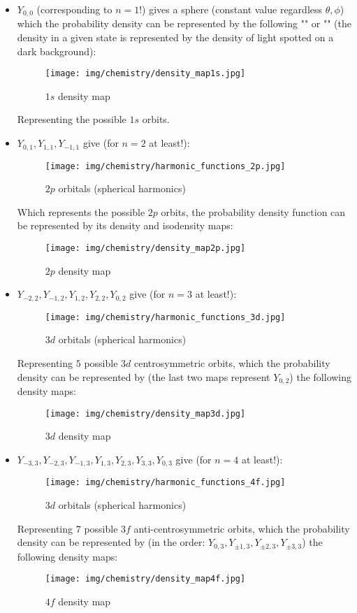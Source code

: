 	\begin{itemize}
		\item $Y_{0,0}$ (corresponding to $n=1$!) gives a sphere (constant value regardless $\theta,\phi$) which the probability density can be represented by the following "" or "" (the density in a given state is represented by the density of light spotted on a dark background):
		\begin{figure}[H]
			\centering
			\texttt{[image: img/chemistry/density\_map1s.jpg]}	
			\caption{$1s$ density map}
		\end{figure}
		Representing the possible $1s$ orbits.

		\item $Y_{0,1},Y_{1,1},Y_{-1,1}$ give (for $n=2$  at least!):
		\begin{figure}[H]
			\centering
			\texttt{[image: img/chemistry/harmonic\_functions\_2p.jpg]}	
			\caption{$2p$ orbitals (spherical harmonics)}
		\end{figure}
		Which represents the possible $2p$ orbits, the probability density function can be represented by its density and isodensity maps:
		\begin{figure}[H]
			\centering
			\texttt{[image: img/chemistry/density\_map2p.jpg]}	
			\caption{$2p$ density map}
		\end{figure}

		\item $Y_{-2,2},Y_{-1,2},Y_{1,2},Y_{2,2},Y_{0,2}$ give (for $n=3$  at least!):
		\begin{figure}[H]
			\centering
			\texttt{[image: img/chemistry/harmonic\_functions\_3d.jpg]}	
			\caption{$3d$ orbitals (spherical harmonics)}
		\end{figure}
		Representing $5$ possible $3d$ centrosymmetric  orbits, which the probability density can be represented by (the last two maps represent $Y_{0,2}$) the following density maps:
		\begin{figure}[H]
			\centering
			\texttt{[image: img/chemistry/density\_map3d.jpg]}	
			\caption{$3d$ density map}
		\end{figure}

		\item $Y_{-3,3},Y_{-2,3},Y_{-1,3},Y_{1,3},Y_{2,3},Y_{3,3},Y_{0,3}$ give (for $n=4$  at least!):
		\begin{figure}[H]
			\centering
			\texttt{[image: img/chemistry/harmonic\_functions\_4f.jpg]}	
			\caption{$3d$ orbitals (spherical harmonics)}
		\end{figure}
		Representing $7$ possible $3f$ anti-centrosymmetric  orbits, which the probability density can be represented by (in the order: $Y_{0,3},Y_{\pm 1,3},Y_{\pm 2,3},Y_{\pm 3,3}$) the following density maps:
		\begin{figure}[H]
			\centering
			\texttt{[image: img/chemistry/density\_map4f.jpg]}	
			\caption{$4f$ density map}
		\end{figure}
	\end{itemize}
